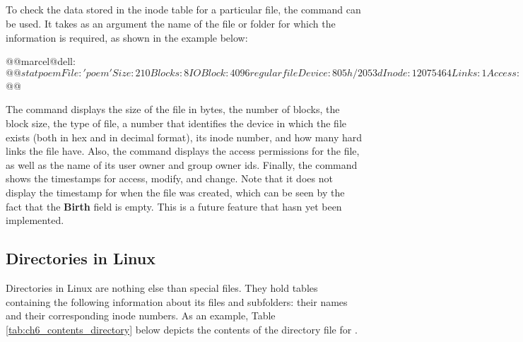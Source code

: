 \subsection{}
To check the data stored in the inode table for a particular file, the   command can be used. It takes as an argument the name of the file or folder for which the information is required, as shown in the example below:
\begin{command_line}[Bash]
@@marcel@dell:~$@@ stat poem
  File:  'poem'
  Size: 210       	Blocks: 8          IO Block: 4096   regular file
Device: 805h/2053d	Inode: 12075464    Links: 1
Access:(0664/-rw-rw-r--)  Uid:(1000/marcel)  Gid:(1000/marcel)
Access: 2016-08-01 17:54:19.553690653 -0400
Modify: 2016-07-27 21:49:03.334173611 -0400
Change: 2016-07-27 21:49:03.334173611 -0400
 Birth: -
@@marcel@dell:~$@@
\end{command_line}
The  command displays the size of the file in bytes, the number of blocks, the block size, the type of file, a number that identifies the device in which the file exists (both in hex and in decimal format), its inode number, and how many hard links the file have. Also, the  command displays the access permissions for the file, as well as the name of its user owner and group owner ids. Finally, the  command shows the timestamps for access, modify, and change. Note that it does not display the timestamp for when the file was created, which can be seen by the fact that the \textbf{Birth} field is empty. This is a future feature that hasn yet been implemented.

\subsection{Directories in Linux}
\label{sec:ch6_directories}

Directories in Linux are nothing else than special files. They  hold tables containing the following information about its files and subfolders: their names and their corresponding inode numbers. As an example, Table \ref{tab:ch6_contents_directory} below depicts the contents of the directory file for .


